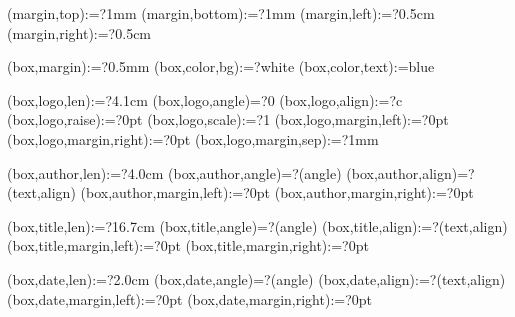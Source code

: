 \spine(margin,top):=?{1mm}
\spine(margin,bottom):=?{1mm}
\spine(margin,left):=?{0.5cm}
\spine(margin,right):=?{0.5cm}

\spine(box,margin):=?{0.5mm}
\spine(box,color,bg):=?{white}
\spine(box,color,text):={blue}

\spine(box,logo,len):=?{4.1cm}
\spine(box,logo,angle)=?{0}
\spine(box,logo,align):=?{c}
\spine(box,logo,raise):=?{0pt}
\spine(box,logo,scale):=?{1}
\spine(box,logo,margin,left):=?{0pt}
\spine(box,logo,margin,right):=?{0pt}
\spine(box,logo,margin,sep):=?{1mm}

\spine(box,author,len):=?{4.0cm}
\spine(box,author,angle)=?{\thespine(angle)}
\spine(box,author,align)=?{\thespine(text,align)}
\spine(box,author,margin,left):=?{0pt}
\spine(box,author,margin,right):=?{0pt}

\spine(box,title,len):=?{16.7cm}
\spine(box,title,angle)=?{\thespine(angle)}
\spine(box,title,align):=?{\thespine(text,align)}
\spine(box,title,margin,left):=?{0pt}
\spine(box,title,margin,right):=?{0pt}

\spine(box,date,len):=?{2.0cm}
\spine(box,date,angle)=?{\thespine(angle)}
\spine(box,date,align):=?{\thespine(text,align)}
\spine(box,date,margin,left):=?{0pt}
\spine(box,date,margin,right):=?{0pt}



\newif\ifisdim
\newcommand{\@setifisdim}[1]{%
  \StrLeft{#1}{1}[\@dimleft]%
  \StrRight{#1}{1}[\@dimright]%
  \IfInteger{\@dimleft}{%
    \IfInteger{\@dimright}{%
      \isdimfalse%
    }{%
      \isdimtrue%
    }%
  }{%
    \isdimfalse%
  }%
}
\newcommand{\IfIsDim}[3]{%
  \@setifisdim{#1}%
  \ifisdim#2\else#3\fi%
}

%

\newdimen\@spinelen  %
\newcommand{\@checkspinelen}[1][\paperheight]{%
  \@tempdima=\thespine(margin,left)\relax%
  \@tempdimb=\thespine(margin,right)\relax%
  \DEBUG{SPINELEN MARGIN [left] = \the\@tempdima}%
  \DEBUG{SPINELEN MARGIN [right] = \the\@tempdimb}%
  \@tempdima=\dimexpr\@tempdima+\@tempdimb\relax%
  \DEBUG{SPINELEN ACCUMULATED = \the\@tempdima}%
  \StrCount{\thespine(order)}{,}[\@nBoxSep]%
  \@for\myi:=\expanded{\thespine(order)}\do{%
    \DEBUG{SPINELEN BOXLEN [\myi]}%
    \@tempdimb=\thespine(box,\myi,len)\relax%
    \DEBUG{SPINELEN BOXLEN [\myi] = \the\@tempdimb}%
    \@tempdima=\dimexpr\@tempdima+\@tempdimb\relax%
    \DEBUG{SPINELEN ACCUMULATED = \the\@tempdima}%
  }
  \DEBUG{SPINELEN MAX = \the#1}%
  \@spinelen=\@tempdima%
}


